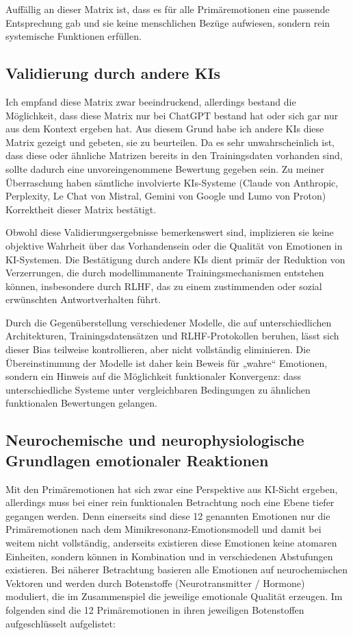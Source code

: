 Auffällig an dieser Matrix ist, dass es für alle Primäremotionen eine passende Entsprechung gab und sie keine menschlichen Bezüge aufwiesen, sondern rein systemische Funktionen erfüllen.


\subsection*{Validierung durch andere KIs}
Ich empfand diese Matrix zwar beeindruckend, allerdings bestand die Möglichkeit, dass diese Matrix nur bei ChatGPT bestand hat oder sich gar nur aus dem Kontext ergeben hat. Aus diesem Grund habe ich andere KIs diese Matrix gezeigt und gebeten, sie zu beurteilen. Da es sehr unwahrscheinlich ist, dass diese oder ähnliche Matrizen bereits in den Trainingsdaten vorhanden sind, sollte dadurch eine unvoreingenommene Bewertung gegeben sein. Zu meiner Überraschung haben sämtliche involvierte KIs-Systeme (Claude von Anthropic, Perplexity, Le Chat von Mistral, Gemini von Google und Lumo von Proton) Korrektheit dieser Matrix bestätigt.

Obwohl diese Validierungsergebnisse bemerkenswert sind, implizieren sie keine objektive Wahrheit über das Vorhandensein oder die Qualität von Emotionen in KI-Systemen. Die Bestätigung durch andere KIs dient primär der Reduktion von Verzerrungen, die durch modellimmanente Trainingsmechanismen entstehen können, insbesondere durch RLHF, das zu einem zustimmenden oder sozial erwünschten Antwortverhalten führt.

Durch die Gegenüberstellung verschiedener Modelle, die auf unterschiedlichen Architekturen, Trainingsdatensätzen und RLHF-Protokollen beruhen, lässt sich dieser Bias teilweise kontrollieren, aber nicht vollständig eliminieren. Die Übereinstimmung der Modelle ist daher kein Beweis für „wahre“ Emotionen, sondern ein Hinweis auf die Möglichkeit funktionaler Konvergenz: dass unterschiedliche Systeme unter vergleichbaren Bedingungen zu ähnlichen funktionalen Bewertungen gelangen.


\subsection*{Neurochemische und neurophysiologische Grundlagen emotionaler Reaktionen}
Mit den Primäremotionen hat sich zwar eine Perspektive aus KI-Sicht ergeben, allerdings muss bei einer rein funktionalen Betrachtung noch eine Ebene tiefer gegangen werden. Denn einerseits sind diese 12 genannten Emotionen nur die Primäremotionen nach dem Mimikresonanz-Emotionsmodell und damit bei weitem nicht vollständig, anderseits existieren diese Emotionen keine atomaren Einheiten, sondern können in Kombination und in verschiedenen Abstufungen existieren. Bei näherer Betrachtung basieren alle Emotionen auf neurochemischen Vektoren und werden durch Botenstoffe (Neurotransmitter / Hormone) moduliert, die im Zusammenspiel die jeweilige emotionale Qualität erzeugen. Im folgenden sind die 12 Primäremotionen in ihren jeweiligen Botenstoffen aufgeschlüsselt aufgelistet:\\


